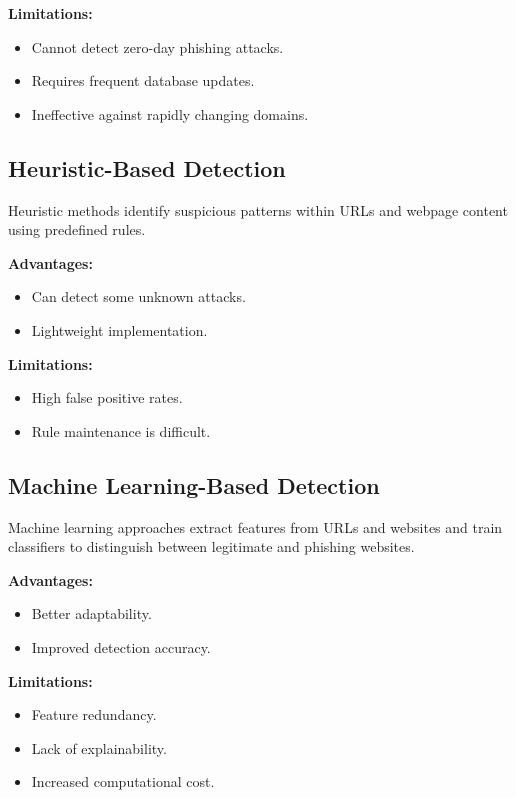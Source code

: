 \documentclass[12pt]{report}
\begin{document}
\textbf{Limitations:}
\begin{itemize}
    \item Cannot detect zero-day phishing attacks.
    \item Requires frequent database updates.
    \item Ineffective against rapidly changing domains.
\end{itemize}

\subsection{Heuristic-Based Detection}

Heuristic methods identify suspicious patterns within URLs and webpage content using predefined rules.

\textbf{Advantages:}
\begin{itemize}
    \item Can detect some unknown attacks.
    \item Lightweight implementation.
\end{itemize}

\textbf{Limitations:}
\begin{itemize}
    \item High false positive rates.
    \item Rule maintenance is difficult.
\end{itemize}

\subsection{Machine Learning-Based Detection}

Machine learning approaches extract features from URLs and websites and train classifiers to distinguish between legitimate and phishing websites.

\textbf{Advantages:}
\begin{itemize}
    \item Better adaptability.
    \item Improved detection accuracy.
\end{itemize}

\textbf{Limitations:}
\begin{itemize}
    \item Feature redundancy.
    \item Lack of explainability.
    \item Increased computational cost.
\end{itemize}
\end{document}
